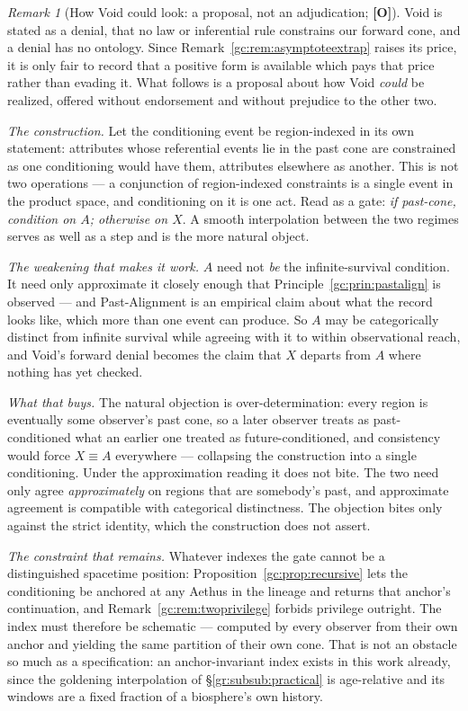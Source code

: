 \documentclass[11pt]{article}
\numberwithin{equation}{section}
\theoremstyle{plain}
\theoremstyle{definition}
\theoremstyle{remark}
\newtheorem{remark}[theorem]{Remark}
\begin{document}
\begin{remark}[How Void could look: a proposal, not an adjudication;
\textbf{[O]}]\label{gc:rem:voidontology}
Void is stated as a denial, that no law or inferential rule
constrains our forward cone, and a denial has no ontology. Since
Remark~\ref{gc:rem:asymptoteextrap} raises its price, it is only fair to
record that a positive form is available which pays that price rather
than evading it. What follows is a proposal about how Void \emph{could}
be realized, offered without endorsement and without prejudice to the
other two.

\emph{The construction.} Let the conditioning event be region-indexed in
its own statement: attributes whose referential events lie in the past
cone are constrained as one conditioning would have them, attributes
elsewhere as another. This is not two operations --- a conjunction of
region-indexed constraints is a single event in the product space, and
conditioning on it is one act. Read as a gate: \emph{if past-cone,
condition on $A$; otherwise on $X$}. A smooth interpolation between the
two regimes serves as well as a step and is the more natural object.

\emph{The weakening that makes it work.} $A$ need not \emph{be} the
infinite-survival condition. It need only approximate it closely enough
that Principle~\ref{gc:prin:pastalign} is observed --- and
Past-Alignment is an empirical claim about what the record looks like,
which more than one event can produce. So $A$ may be categorically
distinct from infinite survival while agreeing with it to within
observational reach, and Void's forward denial becomes the claim that
$X$ departs from $A$ where nothing has yet checked.

\emph{What that buys.} The natural objection is over-determination:
every region is eventually some observer's past cone, so a later
observer treats as past-conditioned what an earlier one treated as
future-conditioned, and consistency would force $X\equiv A$ everywhere
--- collapsing the construction into a single conditioning. Under the
approximation reading it does not bite. The two need only agree
\emph{approximately} on regions that are somebody's past, and
approximate agreement is compatible with categorical distinctness. The
objection bites only against the strict identity, which the construction
does not assert.

\emph{The constraint that remains.} Whatever indexes the gate cannot be
a distinguished spacetime position: Proposition~\ref{gc:prop:recursive}
lets the conditioning be anchored at any Aethus in the lineage and
returns that anchor's continuation, and
Remark~\ref{gc:rem:twoprivilege} forbids privilege outright. The index
must therefore be schematic --- computed by every observer from their
own anchor and yielding the same partition of their own cone. That is
not an obstacle so much as a specification: an anchor-invariant index
exists in this work already, since the goldening interpolation of
\S\ref{gr:subsub:practical} is age-relative and its windows are a fixed
fraction of a biosphere's own history.


\end{remark}
\end{document}
